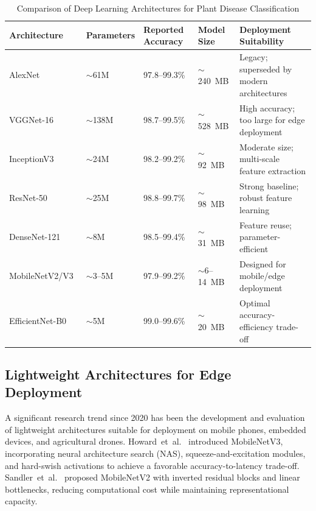 \documentclass[journal]{IEEEtran}
\begin{document}
\begin{table}[htbp]
  \centering
  \caption{Comparison of Deep Learning Architectures for Plant Disease Classification}
  \label{tab:disease_architectures}
  \begin{tabular}{L{2.8cm} C{1.5cm} C{1.8cm} C{1.8cm} L{5.5cm}}
    \toprule
    \textbf{Architecture} & \textbf{Parameters} & \textbf{Reported Accuracy} & \textbf{Model Size} & \textbf{Deployment Suitability} \\
    \midrule
    AlexNet~\cite{mohanty2016using} & $\sim$61M & 97.8--99.3\% & $\sim$240~MB & Legacy; superseded by modern architectures \\
    VGGNet-16~\cite{simonyan2015very} & $\sim$138M & 98.7--99.5\% & $\sim$528~MB & High accuracy; too large for edge deployment \\
    InceptionV3~\cite{szegedy2016rethinking} & $\sim$24M & 98.2--99.2\% & $\sim$92~MB & Moderate size; multi-scale feature extraction \\
    ResNet-50~\cite{he2016deep} & $\sim$25M & 98.8--99.7\% & $\sim$98~MB & Strong baseline; robust feature learning \\
    DenseNet-121~\cite{huang2017densely} & $\sim$8M & 98.5--99.4\% & $\sim$31~MB & Feature reuse; parameter-efficient \\
    MobileNetV2/V3~\cite{sandler2018mobilenetv2,howard2019searching} & $\sim$3--5M & 97.9--99.2\% & $\sim$6--14~MB & Designed for mobile/edge deployment \\
    EfficientNet-B0~\cite{tan2019efficientnet} & $\sim$5M & 99.0--99.6\% & $\sim$20~MB & Optimal accuracy-efficiency trade-off \\
    \bottomrule
  \end{tabular}
\end{table}

\subsection{Lightweight Architectures for Edge Deployment}

A significant research trend since 2020 has been the development and evaluation of lightweight architectures suitable for deployment on mobile phones, embedded devices, and agricultural drones. Howard~et~al.~\cite{howard2019searching} introduced MobileNetV3, incorporating neural architecture search (NAS), squeeze-and-excitation modules, and hard-swish activations to achieve a favorable accuracy-to-latency trade-off. Sandler~et~al.~\cite{sandler2018mobilenetv2} proposed MobileNetV2 with inverted residual blocks and linear bottlenecks, reducing computational cost while maintaining representational capacity.
\end{document}
